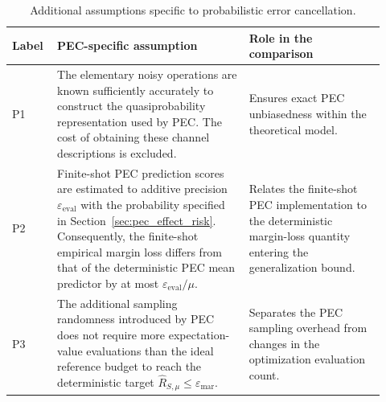\begin{table}[!htbp]
\centering
\small
\renewcommand{\arraystretch}{1.2}
\begin{tabular}{p{0.10\linewidth} p{0.48\linewidth} p{0.34\linewidth}}
\hline
\textbf{Label} &
\textbf{PEC-specific assumption} &
\textbf{Role in the comparison}
\\
\hline

P1 &
The elementary noisy operations are known sufficiently accurately to
construct the quasiprobability representation used by PEC. The cost of
obtaining these channel descriptions is excluded. &
Ensures exact PEC unbiasedness within the theoretical model.
\\

P2 &
Finite-shot PEC prediction scores are estimated to additive precision
$\varepsilon_{\mathrm{eval}}$ with the probability specified in
Section~\ref{sec:pec_effect_risk}. Consequently, the finite-shot empirical
margin loss differs from that of the deterministic PEC mean predictor by at
most $\varepsilon_{\mathrm{eval}}/\mu$. &
Relates the finite-shot PEC implementation to the deterministic
margin-loss quantity entering the generalization bound.
\\

P3 &
The additional sampling randomness introduced by PEC does not require more expectation-value evaluations than the ideal reference budget to reach the deterministic target $\widehat R_{S,\mu}\leq\varepsilon_{\mathrm{mar}}$. &
Separates the PEC sampling overhead from changes in the optimization evaluation count.
\\

\hline
\end{tabular}
\caption{Additional assumptions specific to probabilistic error
cancellation.}
\label{tab:pec_assumptions}
\end{table}
